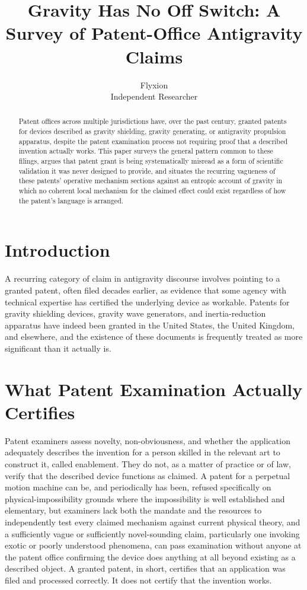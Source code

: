 \documentclass[11pt]{article}
\title{Gravity Has No Off Switch: A Survey of Patent-Office Antigravity Claims}
\author{Flyxion \\ \small Independent Researcher}
\date{}
\begin{document}
\maketitle

\begin{abstract}
Patent offices across multiple jurisdictions have, over the past century, granted patents for devices described as gravity shielding, gravity generating, or antigravity propulsion apparatus, despite the patent examination process not requiring proof that a described invention actually works. This paper surveys the general pattern common to these filings, argues that patent grant is being systematically misread as a form of scientific validation it was never designed to provide, and situates the recurring vagueness of these patents' operative mechanism sections against an entropic account of gravity in which no coherent local mechanism for the claimed effect could exist regardless of how the patent's language is arranged.
\end{abstract}

\section{Introduction}

A recurring category of claim in antigravity discourse involves pointing to a granted patent, often filed decades earlier, as evidence that some agency with technical expertise has certified the underlying device as workable. Patents for gravity shielding devices, gravity wave generators, and inertia-reduction apparatus have indeed been granted in the United States, the United Kingdom, and elsewhere, and the existence of these documents is frequently treated as more significant than it actually is.

\section{What Patent Examination Actually Certifies}

Patent examiners assess novelty, non-obviousness, and whether the application adequately describes the invention for a person skilled in the relevant art to construct it, called enablement. They do not, as a matter of practice or of law, verify that the described device functions as claimed. A patent for a perpetual motion machine can be, and periodically has been, refused specifically on physical-impossibility grounds where the impossibility is well established and elementary, but examiners lack both the mandate and the resources to independently test every claimed mechanism against current physical theory, and a sufficiently vague or sufficiently novel-sounding claim, particularly one invoking exotic or poorly understood phenomena, can pass examination without anyone at the patent office confirming the device does anything at all beyond existing as a described object. A granted patent, in short, certifies that an application was filed and processed correctly. It does not certify that the invention works.
\end{document}
